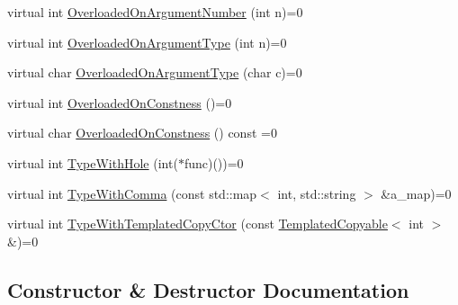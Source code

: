\begin{DoxyCompactItemize}
\item 
virtual int \mbox{\hyperlink{classtesting_1_1gmock__function__mocker__test_1_1_foo_interface_abc3dde10866e94084cdf5b3b412d2274}{Overloaded\+On\+Argument\+Number}} (int n)=0
\item 
virtual int \mbox{\hyperlink{classtesting_1_1gmock__function__mocker__test_1_1_foo_interface_a78fc84ae56ba53a36047f0791d03fc58}{Overloaded\+On\+Argument\+Type}} (int n)=0
\item 
virtual char \mbox{\hyperlink{classtesting_1_1gmock__function__mocker__test_1_1_foo_interface_ae45c3906c2196a0978720b91c521f91f}{Overloaded\+On\+Argument\+Type}} (char c)=0
\item 
virtual int \mbox{\hyperlink{classtesting_1_1gmock__function__mocker__test_1_1_foo_interface_a94e43dbddc176d1702a7a7d7281f2642}{Overloaded\+On\+Constness}} ()=0
\item 
virtual char \mbox{\hyperlink{classtesting_1_1gmock__function__mocker__test_1_1_foo_interface_a9014d2f6527f719b718b0915b27ff5c5}{Overloaded\+On\+Constness}} () const =0
\item 
virtual int \mbox{\hyperlink{classtesting_1_1gmock__function__mocker__test_1_1_foo_interface_aa14850645cd7a5462480f1717df5153c}{Type\+With\+Hole}} (int($\ast$func)())=0
\item 
virtual int \mbox{\hyperlink{classtesting_1_1gmock__function__mocker__test_1_1_foo_interface_af1f1d96db798fadbf53fbd886e7c738e}{Type\+With\+Comma}} (const std\+::map$<$ int, std\+::string $>$ \&a\+\_\+map)=0
\item 
virtual int \mbox{\hyperlink{classtesting_1_1gmock__function__mocker__test_1_1_foo_interface_af9e3190c69647229baed1dba41c2fdf8}{Type\+With\+Templated\+Copy\+Ctor}} (const \mbox{\hyperlink{classtesting_1_1gmock__function__mocker__test_1_1_templated_copyable}{Templated\+Copyable}}$<$ int $>$ \&)=0
\end{DoxyCompactItemize}


\subsection{Constructor \& Destructor Documentation}
\mbox{\label{classtesting_1_1gmock__function__mocker__test_1_1_foo_interface_a608b0da2acf1fc3c51f56d55a839edc5}} 
